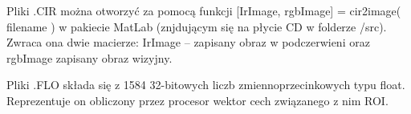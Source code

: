 Pliki .CIR można otworzyć za pomocą funkcji [IrImage, rgbImage] = cir2image( filename ) w pakiecie MatLab (znjdującym się na płycie CD w folderze /src). Zwraca ona dwie macierze: IrImage -- zapisany obraz w podczerwieni oraz rgbImage zapisany obraz wizyjny.

Pliki .FLO składa się z 1584 32-bitowych liczb zmiennoprzecinkowych typu float. 
Reprezentuje on obliczony przez procesor wektor cech związanego z nim ROI.
